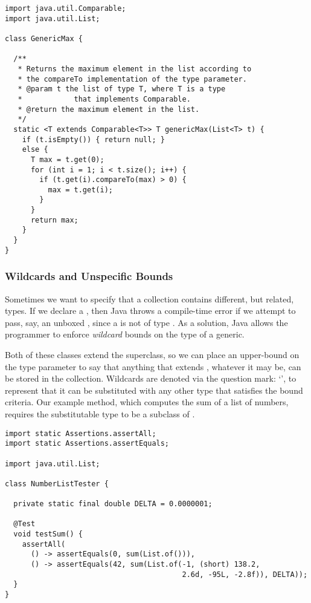 \begin{lstlisting}[language=MyJava]
import java.util.Comparable;
import java.util.List;

class GenericMax {
  
  /**
   * Returns the maximum element in the list according to 
   * the compareTo implementation of the type parameter.
   * @param t the list of type T, where T is a type 
   *            that implements Comparable.
   * @return the maximum element in the list.
   */
  static <T extends Comparable<T>> T genericMax(List<T> t) {
    if (t.isEmpty()) { return null; }
    else {
      T max = t.get(0);
      for (int i = 1; i < t.size(); i++) {
        if (t.get(i).compareTo(max) > 0) { 
          max = t.get(i); 
        }
      }
      return max;
    }
  }
}
\end{lstlisting}

\subsubsection*{Wildcards and Unspecific Bounds}
Sometimes we want to specify that a collection contains different, but related, types. 
If we declare a , then Java throws a compile-time error if we attempt to pass, say, an unboxed , since a  is not of type . 
As a solution, Java allows the programmer to enforce \emph{wildcard} bounds on the type of a generic. 

Both of these classes extend the  superclass, so we can place an upper-bound on the type parameter to say that anything that extends , whatever it may be, can be stored in the collection. 
Wildcards are denoted via the question mark: `', to represent that it can be substituted with any other type that satisfies the bound criteria. 
Our example method, which computes the sum of a list of numbers, requires the substitutable type to be a subclass of .

\begin{lstlisting}[language=MyJava]
import static Assertions.assertAll;
import static Assertions.assertEquals;

import java.util.List;

class NumberListTester {

  private static final double DELTA = 0.0000001;

  @Test
  void testSum() {
    assertAll(
      () -> assertEquals(0, sum(List.of())),
      () -> assertEquals(42, sum(List.of(-1, (short) 138.2, 
                                         2.6d, -95L, -2.8f)), DELTA));
  }
}
\end{lstlisting}

